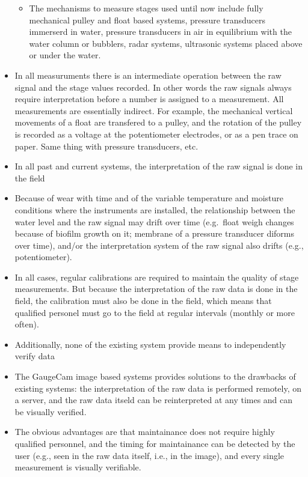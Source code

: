 \documentclass[]{article}
\providecommand{\tightlist}{%
  \setlength{\itemsep}{0pt}\setlength{\parskip}{0pt}}
\begin{document}
\begin{itemize}
  \begin{itemize}
  \tightlist
  \item
    The mechanisms to measure stages used until now include fully mechanical pulley and float based systems, pressure transducers immerserd in water, pressure transducers in air in equilibrium with the water column or bubblers, radar systems, ultrasonic systems placed above or under the water.
  \end{itemize}
\item
  In all measuruments there is an intermediate operation between the raw signal and the stage values recorded. In other words the raw signals always require interpretation before a number is assigned to a measurement. All measurements are essentially indirect. For example, the mechanical vertical movements of a float are transfered to a pulley, and the rotation of the pulley is recorded as a voltage at the potentiometer electrodes, or as a pen trace on paper. Same thing with pressure transducers, etc.
\item
  In all past and current systems, the interpretation of the raw signal is done in the field
\item
  Because of wear with time and of the variable temperature and moisture conditions where the instruments are installed, the relationship between the water level and the raw signal may drift over time (e.g.~float weigh changes because of biofilm growth on it; membrane of a pressure transducer diforms over time), and/or the interpretation system of the raw signal also drifts (e.g., potentiometer).
\item
  In all cases, regular calibrations are required to maintain the quality of stage measurements. But because the interpretation of the raw data is done in the field, the calibration must also be done in the field, which means that qualified personel must go to the field at regular intervals (monthly or more often).
\item
  Additionally, none of the existing system provide means to independently verify data
\item
  The GaugeCam image based systems provides solutions to the drawbacks of existing systems: the interpretation of the raw data is performed remotely, on a server, and the raw data itseld can be reinterpreted at any times and can be visually verified.
\item
  The obvious advantages are that maintainance does not require highly qualified personnel, and the timing for maintainance can be detected by the user (e.g., seen in the raw data itself, i.e., in the image), and every single measurement is visually verifiable.

\end{itemize}
\end{document}
